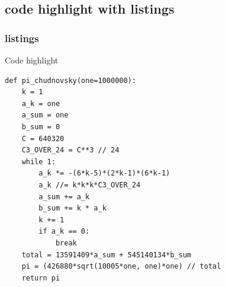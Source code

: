 \documentclass{beamer}
\begin{document}
\subsection{code highlight with listings}
\begin{frame}[fragile]
  \frametitle{listings}
      \begin{block}{Code highlight}
\begin{tiny}
\lstset{language=Python,escapechar=@,style=customcode}
\begin{lstlisting} 
def pi_chudnovsky(one=1000000):
    k = 1
    a_k = one
    a_sum = one
    b_sum = 0
    C = 640320
    C3_OVER_24 = C**3 // 24
    while 1:
        a_k *= -(6*k-5)*(2*k-1)*(6*k-1)
        a_k //= k*k*k*C3_OVER_24
        a_sum += a_k
        b_sum += k * a_k
        k += 1
        if a_k == 0:
            break
    total = 13591409*a_sum + 545140134*b_sum
    pi = (426880*sqrt(10005*one, one)*one) // total
    return pi
\end{lstlisting}
\end{tiny}
  \end{block}
\end{frame}
\end{document}
